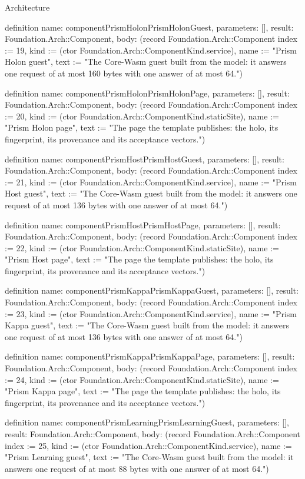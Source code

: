 \begin{lexlean}{Architecture}
\begin{semanticmodule}
definition{
  name: componentPrismHolonPrismHolonGuest,
  parameters: [],
  result: Foundation.Arch::Component,
  body: (record Foundation.Arch::Component {index := 19, kind := (ctor Foundation.Arch::ComponentKind.service), name := "Prism Holon guest", text := "The Core-Wasm guest built from the model: it answers one request of at most 160 bytes with one answer of at most 64."})
}

definition{
  name: componentPrismHolonPrismHolonPage,
  parameters: [],
  result: Foundation.Arch::Component,
  body: (record Foundation.Arch::Component {index := 20, kind := (ctor Foundation.Arch::ComponentKind.staticSite), name := "Prism Holon page", text := "The page the template publishes: the holo, its fingerprint, its provenance and its acceptance vectors."})
}

definition{
  name: componentPrismHostPrismHostGuest,
  parameters: [],
  result: Foundation.Arch::Component,
  body: (record Foundation.Arch::Component {index := 21, kind := (ctor Foundation.Arch::ComponentKind.service), name := "Prism Host guest", text := "The Core-Wasm guest built from the model: it answers one request of at most 136 bytes with one answer of at most 64."})
}

definition{
  name: componentPrismHostPrismHostPage,
  parameters: [],
  result: Foundation.Arch::Component,
  body: (record Foundation.Arch::Component {index := 22, kind := (ctor Foundation.Arch::ComponentKind.staticSite), name := "Prism Host page", text := "The page the template publishes: the holo, its fingerprint, its provenance and its acceptance vectors."})
}

definition{
  name: componentPrismKappaPrismKappaGuest,
  parameters: [],
  result: Foundation.Arch::Component,
  body: (record Foundation.Arch::Component {index := 23, kind := (ctor Foundation.Arch::ComponentKind.service), name := "Prism Kappa guest", text := "The Core-Wasm guest built from the model: it answers one request of at most 136 bytes with one answer of at most 64."})
}

definition{
  name: componentPrismKappaPrismKappaPage,
  parameters: [],
  result: Foundation.Arch::Component,
  body: (record Foundation.Arch::Component {index := 24, kind := (ctor Foundation.Arch::ComponentKind.staticSite), name := "Prism Kappa page", text := "The page the template publishes: the holo, its fingerprint, its provenance and its acceptance vectors."})
}

definition{
  name: componentPrismLearningPrismLearningGuest,
  parameters: [],
  result: Foundation.Arch::Component,
  body: (record Foundation.Arch::Component {index := 25, kind := (ctor Foundation.Arch::ComponentKind.service), name := "Prism Learning guest", text := "The Core-Wasm guest built from the model: it answers one request of at most 88 bytes with one answer of at most 64."})
}


\end{semanticmodule}
\end{lexlean}
